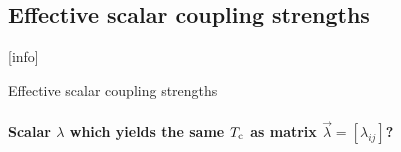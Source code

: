 \documentclass[10pt]{beamer}
\begin{document}
    \subsection[Effective scalars]{Effective scalar coupling strengths}

    [info]{}

    \newsavebox\TcA
    \newsavebox\TcB

    \savebox\TcA{\small}
    \savebox\TcB{\small}

    \begin{frame}[label=scalars]{Effective scalar coupling strengths}
        \framesubtitle{
            Scalar $\lambda$ which yields the same $T \sb{\text{c}}$ as matrix $\vec
            \lambda = [\lambda_{i j}]$?}


\end{frame}
\end{document}
